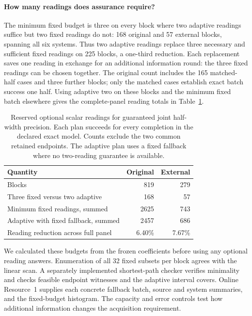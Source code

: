 \paragraph{How many readings does assurance require?}
The minimum fixed budget is three on every block where two adaptive
readings suffice but two fixed readings do not: 168 original and 57 external
blocks, spanning all six systems. Thus two adaptive readings replace three
necessary and sufficient fixed readings on 225 blocks, a one-third reduction.
Each replacement saves one reading in exchange for an additional information
round: the three fixed readings can be chosen together.
The original count includes the 165 matched-half cases and three further
blocks; only the matched cases establish exact batch success one half.
Using adaptive two on these blocks and the minimum fixed batch elsewhere
gives the complete-panel reading totals in Table~\ref{tab:minimum-reading-budget}.

\begin{table}[htbp]\centering\small
\caption{Reserved optional scalar readings for guaranteed joint half-width
precision. Each plan succeeds for every completion in the declared exact
model. Counts exclude the two common retained endpoints. The adaptive plan
uses a fixed fallback where no two-reading guarantee is available.}
\label{tab:minimum-reading-budget}
\begin{tabular}{lrr}\toprule
Quantity & Original & External\\\midrule
Blocks & 819 & 279\\
Three fixed versus two adaptive & 168 & 57\\
Minimum fixed readings, summed & 2625 & 743\\
Adaptive with fixed fallback, summed & 2457 & 686\\
Reading reduction across full panel & 6.40\% & 7.67\%\\\bottomrule
\end{tabular}
\end{table}

We calculated these budgets from the frozen coefficients before using any
optional reading answers.
Enumeration of all 32 fixed subsets per block agrees with the linear scan.
A separately implemented shortest-path checker verifies minimality and
checks feasible endpoint witnesses and the adaptive interval covers.
Online Resource~1 supplies each concrete fallback batch, source and system
summaries, and the fixed-budget histogram. The capacity and error controls
test how additional information changes the acquisition requirement.
